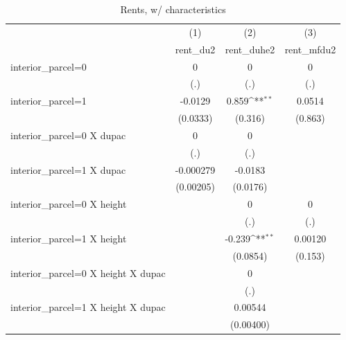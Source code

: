 \begin{table}[htbp]\centering
\def\sym#1{\ifmmode^{#1}\else\(^{#1}\)\fi}
\caption{Rents, w/ characteristics}
\begin{tabular}{l*{3}{c}}
\hline\hline
                    &\multicolumn{1}{c}{(1)}&\multicolumn{1}{c}{(2)}&\multicolumn{1}{c}{(3)}\\
                    &\multicolumn{1}{c}{rent\_du2}&\multicolumn{1}{c}{rent\_duhe2}&\multicolumn{1}{c}{rent\_mfdu2}\\
\hline
interior\_parcel=0   &           0         &           0         &           0         \\
                    &         (.)         &         (.)         &         (.)         \\
[1em]
interior\_parcel=1   &     -0.0129         &       0.859\sym{**} &      0.0514         \\
                    &    (0.0333)         &     (0.316)         &     (0.863)         \\
[1em]
interior\_parcel=0 X dupac&           0         &           0         &                     \\
                    &         (.)         &         (.)         &                     \\
[1em]
interior\_parcel=1 X dupac&   -0.000279         &     -0.0183         &                     \\
                    &   (0.00205)         &    (0.0176)         &                     \\
[1em]
interior\_parcel=0 X height&                     &           0         &           0         \\
                    &                     &         (.)         &         (.)         \\
[1em]
interior\_parcel=1 X height&                     &      -0.239\sym{**} &     0.00120         \\
                    &                     &    (0.0854)         &     (0.153)         \\
[1em]
interior\_parcel=0 X height X dupac&                     &           0         &                     \\
                    &                     &         (.)         &                     \\
[1em]
interior\_parcel=1 X height X dupac&                     &     0.00544         &                     \\
                    &                     &   (0.00400)         &                     \\

\end{tabular}
\end{table}
